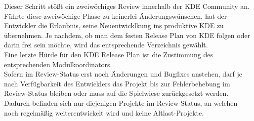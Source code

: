 Dieser Schritt stößt ein zweiwöchiges Review innerhalb der KDE Community an. Führte diese zweiwöchige Phase zu keinerlei Änderungswünschen, hat der Entwickler die Erlaubnis, seine Neuentwicklkung ins produktive KDE zu übernehmen. Je nachdem, ob man dem festen Release Plan von KDE folgen oder darin frei sein möchte, wird das entsprechende Verzeichnis gewählt.\\
Eine letzte Hürde für den KDE Release Plan ist die Zustimmung des entsprechenden Modulkoordinators.\\
Sofern im Review-Status erst noch Änderungen und Bugfixes anstehen, darf je nach Verfügbarkeit des Entwicklers das Projekt bis zur Fehlerbehebung im Review-Status bleiben oder muss auf die Spielwiese zurückgesetzt werden. Dadurch befinden sich nur diejenigen Projekte im Review-Status, an welchen noch regelmäßig weiterentwickelt wird und keine Altlast-Projekte.
\cite{ApplLife}

